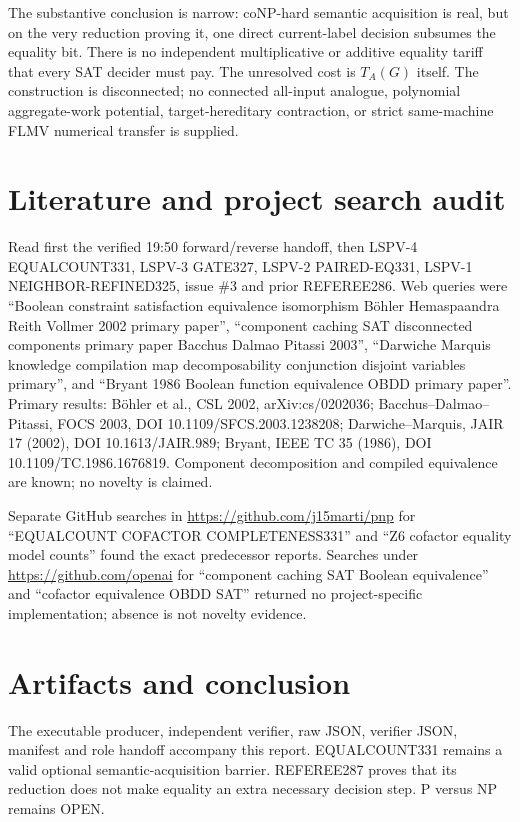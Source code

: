 \documentclass[11pt]{article}
\begin{document}
The substantive conclusion is narrow: coNP-hard semantic acquisition is real, but on the very reduction proving it, one direct current-label decision subsumes the equality bit. There is no independent multiplicative or additive equality tariff that every SAT decider must pay. The unresolved cost is $T_A(G)$ itself. The construction is disconnected; no connected all-input analogue, polynomial aggregate-work potential, target-hereditary contraction, or strict same-machine FLMV numerical transfer is supplied.

\section{Literature and project search audit}
Read first the verified 19:50 forward/reverse handoff, then LSPV-4 EQUALCOUNT331, LSPV-3 GATE327, LSPV-2 PAIRED-EQ331, LSPV-1 NEIGHBOR-REFINED325, issue \#3 and prior REFEREE286. Web queries were ``Boolean constraint satisfaction equivalence isomorphism B\"ohler Hemaspaandra Reith Vollmer 2002 primary paper'', ``component caching SAT disconnected components primary paper Bacchus Dalmao Pitassi 2003'', ``Darwiche Marquis knowledge compilation map decomposability conjunction disjoint variables primary'', and ``Bryant 1986 Boolean function equivalence OBDD primary paper''. Primary results: B\"ohler et al., CSL 2002, arXiv:cs/0202036; Bacchus--Dalmao--Pitassi, FOCS 2003, DOI 10.1109/SFCS.2003.1238208; Darwiche--Marquis, JAIR 17 (2002), DOI 10.1613/JAIR.989; Bryant, IEEE TC 35 (1986), DOI 10.1109/TC.1986.1676819. Component decomposition and compiled equivalence are known; no novelty is claimed.

Separate GitHub searches in \url{https://github.com/j15marti/pnp} for ``EQUALCOUNT COFACTOR COMPLETENESS331'' and ``Z6 cofactor equality model counts'' found the exact predecessor reports. Searches under \url{https://github.com/openai} for ``component caching SAT Boolean equivalence'' and ``cofactor equivalence OBDD SAT'' returned no project-specific implementation; absence is not novelty evidence.

\section{Artifacts and conclusion}
The executable producer, independent verifier, raw JSON, verifier JSON, manifest and role handoff accompany this report. EQUALCOUNT331 remains a valid optional semantic-acquisition barrier. REFEREE287 proves that its reduction does not make equality an extra necessary decision step. P versus NP remains OPEN.
\end{document}
